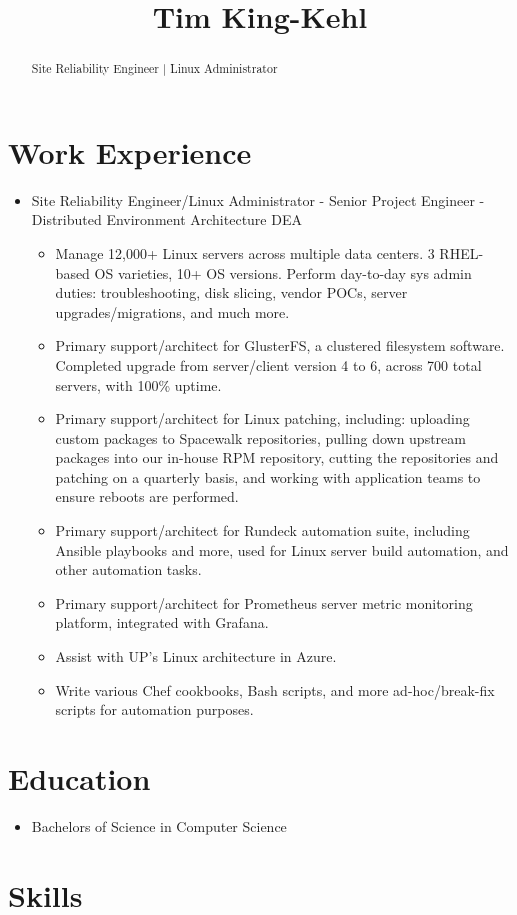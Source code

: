 \documentclass[10pt, a4paper]{article}
\title{Tim King-Kehl}
\date{}
\begin{document}
\begin{abstract}
Site Reliability Engineer | Linux Administrator
\end{abstract}

\section*{Work Experience}
\begin{itemize}
    \item Site Reliability Engineer/Linux Administrator - Senior Project Engineer - Distributed Environment Architecture DEA
    \begin{itemize}
        \item Manage 12,000+ Linux servers across multiple data centers. 3 RHEL-based OS varieties, 10+ OS versions. Perform day-to-day sys admin duties: troubleshooting, disk slicing, vendor POCs, server upgrades/migrations, and much more.
        \item Primary support/architect for GlusterFS, a clustered filesystem software. Completed upgrade from server/client version 4 to 6, across 700 total servers, with 100\% uptime.
        \item Primary support/architect for Linux patching, including: uploading custom packages to Spacewalk repositories, pulling down upstream packages into our in-house RPM repository, cutting the repositories and patching on a quarterly basis, and working with application teams to ensure reboots are performed.
        \item Primary support/architect for Rundeck automation suite, including Ansible playbooks and more, used for Linux server build automation, and other automation tasks.
        \item Primary support/architect for Prometheus server metric monitoring platform, integrated with Grafana.
        \item Assist with UP's Linux architecture in Azure.
        \item Write various Chef cookbooks, Bash scripts, and more ad-hoc/break-fix scripts for automation purposes.
    \end{itemize}
\end{itemize}
\section*{Education}
\begin{itemize}
    \item Bachelors of Science in Computer Science
\end{itemize}

\section*{Skills}
\end{document}
